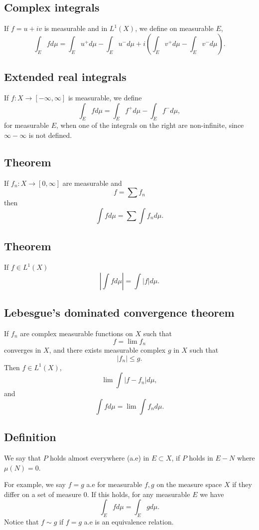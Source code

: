 \documentclass[oneside]{book}
\begin{document}
\subsection{Complex integrals}
If $f=u+iv$ is measurable and in $L^1(X)$, we define on 
measurable $E$,
$$\int_E fd\mu = \int_E u^+d\mu-\int_Eu^-d\mu +i\left(
    \int_E v^+d\mu -\int_E v^-d\mu
\right).$$

\subsection{Extended real integrals}
If $f:X\rightarrow [-\infty, \infty]$ is measurable,
we define
$$\int_E fd\mu = \int_E f^+d\mu - \int_E f^-d\mu,$$
for measurable $E$, when one of the integrals on the right
are non-infinite, since $\infty-\infty$ is not defined.

\subsection{Theorem}\label{series}
If $f_n: X\rightarrow [0,\infty]$ are measurable  and
$$f=\sum f_n$$
then
$$\int fd\mu = \sum \int f_n d\mu.$$

\subsection{Theorem}
If $f\in L^1(X)$
$$\left|\int fd\mu\right| = \int |f|d\mu.$$

\subsection{Lebesgue's dominated convergence theorem}\label{dominated}
If $f_n$ are complex measurable functions on $X$ such that
$$f=\lim f_n$$
converges in $X$, and there exists measurable complex $g$ in $X$
such that
$$|f_n|\leq g.$$
Then $f\in L^1(X)$,
$$\lim \int |f-f_n| d \mu,$$
and
$$\int f d\mu = \lim \int f_n d\mu.$$

\subsection{Definition}
We say that $P$ holds almost everywhere (a.e) in $E\subset X$, if
$P$ holds in $E-N$ where $\mu(N)=0$.

For example, we say $f=g$ a.e for measurable $f,g$
on the measure space $X$ if they differ on a set of measure $0$.
If this holds, for any measurable $E$ we have
$$\int_E fd\mu =\int_E gd\mu.$$
Notice that $f\sim g$ if $f=g$ a.e is an equivalence relation.
\end{document}
